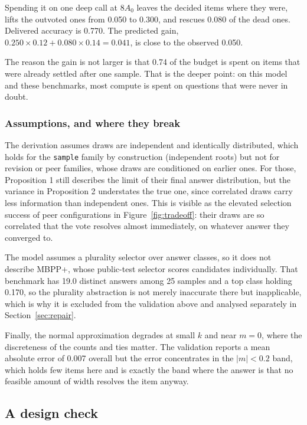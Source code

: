 \documentclass[11pt]{article}
\begin{document}
Spending it on one deep call at $8A_0$ leaves the decided items where they were, lifts the outvoted
ones from 0.050 to 0.300, and rescues 0.080 of the dead ones. Delivered accuracy is 0.770. The
predicted gain, $0.250 \times 0.12 + 0.080 \times 0.14 = 0.041$, is close to the observed 0.050.

The reason the gain is not larger is that 0.74 of the budget is spent on items that were already
settled after one sample. That is the deeper point: on this model and these benchmarks, most compute
is spent on questions that were never in doubt.

\subsubsection*{Assumptions, and where they break}

The derivation assumes draws are independent and identically distributed, which holds for the
\texttt{sample} family by construction (independent roots) but not for revision or peer families,
whose draws are conditioned on earlier ones. For those, Proposition 1 still describes the limit of
their final answer distribution, but the variance in Proposition 2 understates the true one, since
correlated draws carry less information than independent ones. This is visible as the elevated
selection success of peer configurations in Figure~\ref{fig:tradeoff}: their draws are so correlated
that the vote resolves almost immediately, on whatever answer they converged to.

The model assumes a plurality selector over answer classes, so it does not describe MBPP+, whose
public-test selector scores candidates individually. That benchmark has 19.0 distinct answers among
25 samples and a top class holding 0.170, so the plurality abstraction is not merely inaccurate
there but inapplicable, which is why it is excluded from the validation above and analysed
separately in Section~\ref{sec:repair}.

Finally, the normal approximation degrades at small $k$ and near $m = 0$, where the discreteness of
the counts and ties matter. The validation reports a mean absolute error of 0.007 overall but the
error concentrates in the $|m| < 0.2$ band, which holds few items here and is exactly the band
where the answer is that no feasible amount of width resolves the item anyway.

\subsection{A design check}
\end{document}
